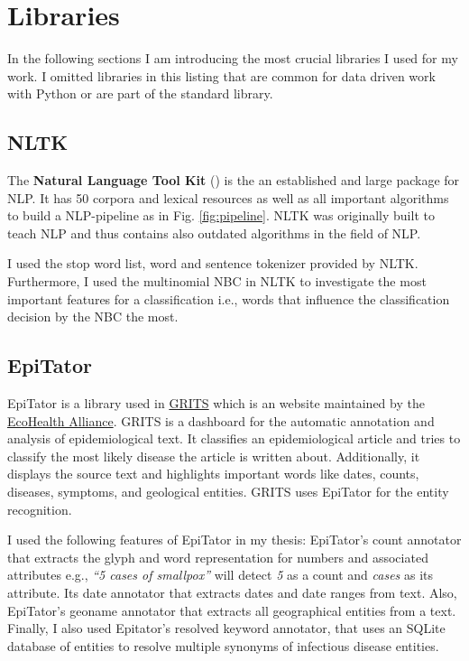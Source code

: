 \section{Libraries}
In the following sections I am introducing the most crucial libraries I used for my work.
I omitted libraries in this listing that are common for data driven work with Python or are part of the standard library.
\subsection{NLTK}
The \textbf{Natural Language Tool Kit} () is the an established and large package for NLP.
It has 50 corpora and lexical resources as well as all important algorithms to build a NLP-pipeline as in Fig. \ref{fig:pipeline}.
NLTK was originally built to teach NLP and thus contains also outdated algorithms in the field of NLP.

I used the stop word list, word and sentence tokenizer provided by NLTK.
Furthermore, I used the multinomial NBC in NLTK to investigate the most important features for a classification i.e., words that influence the classification decision by the NBC the most.

\subsection{EpiTator}
EpiTator is a library used in \href{https://grits.eha.io}{GRITS} which is an website maintained by the \href{https://www.ecohealthalliance.org}{EcoHealth Alliance}.
GRITS is a dashboard for the automatic annotation and analysis of epidemiological text.
It classifies an epidemiological article and tries to classify the most likely disease the article is written about.
Additionally, it displays the source text and highlights important words like dates, counts, diseases, symptoms, and geological entities.
GRITS uses EpiTator for the entity recognition.

I used the following features of EpiTator in my thesis: EpiTator's count annotator that extracts the glyph and word representation for numbers and associated attributes e.g., \textit{``5 cases of smallpox''} will detect \textit{5} as a count and \textit{cases} as its attribute.
Its date annotator that extracts dates and date ranges from text.
Also, EpiTator's geoname annotator that extracts all geographical entities from a text. Finally, I also used Epitator's resolved keyword annotator, that uses an SQLite database of entities to resolve multiple synonyms of infectious disease entities.

